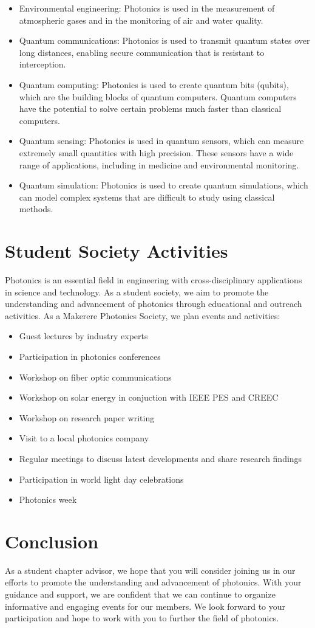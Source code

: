 \documentclass[a4paper]{article}
\begin{document}
\begin{itemize}
        \item Environmental engineering: Photonics is used in the measurement of atmospheric gases and in the monitoring of air and water quality.
        \item Quantum communications: Photonics is used to transmit quantum states over long distances, enabling secure communication that is resistant to interception.
        \item Quantum computing: Photonics is used to create quantum bits (qubits), which are the building blocks of quantum computers. Quantum computers have the potential to solve certain problems much faster than classical computers.
        \item Quantum sensing: Photonics is used in quantum sensors, which can measure extremely small quantities with high precision. These sensors have a wide range of applications, including in medicine and environmental monitoring.
        \item Quantum simulation: Photonics is used to create quantum simulations, which can model complex systems that are difficult to study using classical methods.
    \end{itemize}

    \section{Student Society Activities}
    Photonics is an essential field in engineering with cross-disciplinary applications in science and technology.
    As a student society, we aim to promote the understanding and advancement of photonics through educational and outreach activities.
    As a Makerere Photonics Society, we plan events and activities:
    \begin{itemize}
    \item Guest lectures by industry experts
    \item Participation in photonics conferences
    \item Workshop on fiber optic communications
    \item Workshop on solar energy in conjuction with IEEE PES and CREEC
    \item Workshop on research paper writing
    \item Visit to a local photonics company
    \item Regular meetings to discuss latest developments and share research findings
    \item Participation in world light day celebrations
    \item Photonics week
    \end{itemize}

    \section{Conclusion}
    As a student chapter advisor, we hope that you will consider joining us in our efforts to promote the understanding and advancement of photonics.
    With your guidance and support, we are confident that we can continue to organize informative and engaging events for our members.
    We look forward to your participation and hope to work with you to further the field of photonics.
\end{document}
